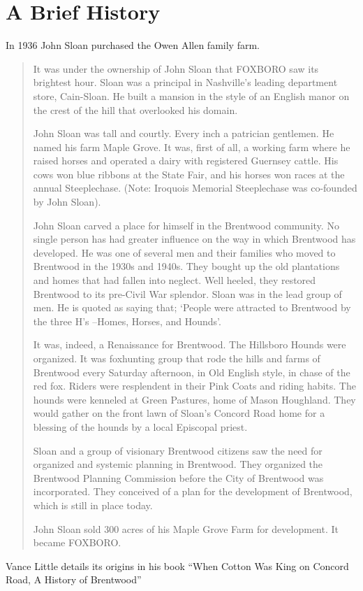 \section{A Brief History}

In 1936 John Sloan purchased the Owen Allen family farm.

\begin{quote}
It was under the ownership of John Sloan that FOXBORO saw its brightest
hour. Sloan was a principal in Nashville’s leading department store,
Cain-Sloan. He built a mansion in the style of an English manor on the
crest of the hill that overlooked his domain.

John Sloan was tall and courtly. Every inch a patrician gentlemen. He
named his farm Maple Grove. It was, first of all, a working farm where he
raised horses and operated a dairy with registered Guernsey cattle. His
cows won blue ribbons at the State Fair, and his horses won races at the
annual Steeplechase. (Note: Iroquois Memorial Steeplechase was co-founded
by John Sloan).

John Sloan carved a place for himself in the Brentwood community. No
single person has had greater influence on the way in which Brentwood
has developed. He was one of several men and their families who moved to
Brentwood in the 1930s and 1940s. They bought up the old plantations and
homes that had fallen into neglect. Well heeled, they restored Brentwood
to its pre-Civil War splendor. Sloan was in the lead group of men. He
is quoted as saying that; ‘People were attracted to Brentwood by the
three H’s –Homes, Horses, and Hounds’.

It was, indeed, a Renaissance for Brentwood. The Hillsboro Hounds were
organized. It was foxhunting group that rode the hills and farms of
Brentwood every Saturday afternoon, in Old English style, in chase of
the red fox. Riders were resplendent in their Pink Coats and riding
habits. The hounds were kenneled at Green Pastures, home of Mason
Houghland. They would gather on the front lawn of Sloan’s Concord Road
home for a blessing of the hounds by a local Episcopal priest.

Sloan and a group of visionary Brentwood citizens saw the need for
organized and systemic planning in Brentwood. They organized the Brentwood
Planning Commission before the City of Brentwood was incorporated. They
conceived of a plan for the development of Brentwood, which is still in
place today.

John Sloan sold 300 acres of his Maple Grove Farm for development. It
became FOXBORO.
\end{quote}

Vance Little details its origins in his book ``When Cotton Was King on
Concord Road, A History of Brentwood''
